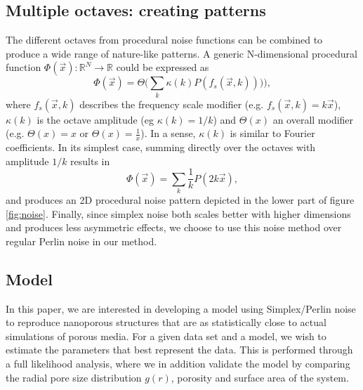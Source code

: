 \documentclass[aps,pre,twocolumn,letterpaper,floatfix,showpacs]{revtex4}
\begin{document}
\subsection{Multiple octaves: creating patterns}
\label{sec:octaves}
The different octaves from procedural noise functions can be combined
to produce a wide range of nature-like patterns. A generic
N-dimensional procedural function $\Phi(\vec x): \mathbb R^N \to
\mathbb R$ could be expressed as
\begin{equation}
\label{eq:procedural}
 \Phi(\vec x) = \Theta \Big(\sum_k \kappa (k) P(  f_s (\vec x,k) )) \Big),
 \end{equation}
where $f_s(\vec x,k)$ describes the frequency scale modifier (e.g. $f_s(\vec x,k) =
k\vec x$), $\kappa(k)$ is the octave amplitude (eg $\kappa(k) = 1/k$)
and $\Theta(x)$ an overall modifier (e.g. $\Theta(x) = x$ or
$\Theta(x) = \frac{1}{x}$). In a sense, $\kappa(k)$ is similar to Fourier coefficients. 
In its simplest case, summing directly
over the octaves with amplitude $1/k$ results in 
\begin{equation}
\label{eq:perlinlinear}
 \Phi(\vec x) = \sum_k \frac{1}{k} P( 2k\vec x), 
\end{equation}
and produces an 2D procedural noise pattern depicted in the lower
part of figure \ref{fig:noise}. Finally, since simplex noise both scales better with higher dimensions and produces less asymmetric effects, we choose to use this noise method over regular Perlin noise in our method.  

\subsection{Model}
In this paper, we are interested in developing a model using Simplex/Perlin noise to reproduce nanoporous structures that are as statistically close to actual simulations of porous media. For a given data set and a model, we wish to estimate the parameters that best represent the data. This is performed through a full likelihood analysis, where we in addition validate the model by comparing the radial pore size distribution $g(r)$, porosity and surface area of the system.  
\end{document}
